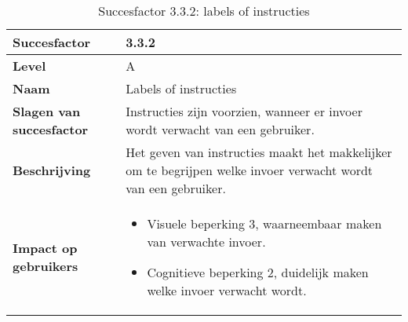 \begin{table}[H]
    \centering
    \caption{Succesfactor 3.3.2: labels of instructies}
    
    
    \hspace*{-1cm}\begin{tabular}{|l|p{12cm}|} 
        \hline
        \textbf{Succesfactor}                 & 3.3.2                                                                                                                                                                                                                                                                                                                                                                                                                                                                                                        \\ 
        \hline
        \textbf{Level}                        & A                                                                                                                                                                                                                                                                                                                                                                                                                                                                                                               \\ 
        \hline
        \textbf{Naam}                         & Labels of instructies~                                                                                                                                                                                                                                                                                                                                                                                                                                                                                      \\ 
        \hline
        \textbf{Slagen van succesfactor}      & Instructies zijn voorzien, wanneer er invoer wordt verwacht van een gebruiker.
        \\  
        \hline
        \textbf{Beschrijving}                 & Het geven van instructies maakt het makkelijker om te begrijpen welke invoer verwacht wordt van een gebruiker.\\ 
        \hline
        \textbf{Impact op gebruikers}         &  
        \begin{itemize}
            \item Visuele beperking 3, waarneembaar maken van verwachte invoer.
            \item Cognitieve beperking 2, duidelijk maken welke invoer verwacht wordt.
        \end{itemize}                                                                                                                                                                                                                                                                                                     \\ 
        

\end{tabular}
\end{table}
